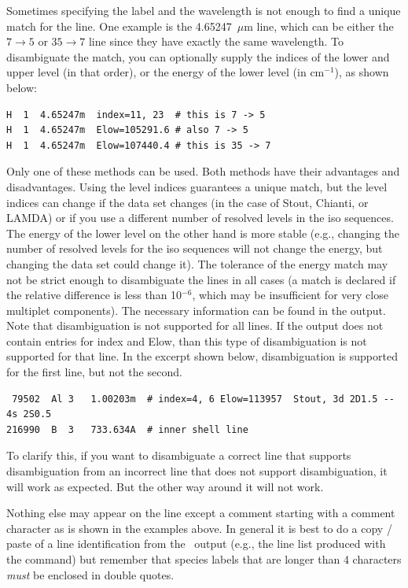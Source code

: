 Sometimes specifying the label and the wavelength is not enough to find a
unique match for the line. One example is the  4.65247~$\mu$m line,
which can be either the $7 \rightarrow 5$ or $35 \rightarrow 7$ line since
they have exactly the same wavelength. To disambiguate the match, you can
optionally supply the indices of the lower and upper level (in that order), or
the energy of the lower level (in cm$^{-1}$), as shown below:
\begin{verbatim}
H  1  4.65247m  index=11, 23  # this is 7 -> 5
H  1  4.65247m  Elow=105291.6 # also 7 -> 5
H  1  4.65247m  Elow=107440.4 # this is 35 -> 7
\end{verbatim}
Only one of these methods can be used. Both methods have their advantages and
disadvantages. Using the level indices guarantees a unique match, but the
level indices can change if the data set changes (in the case of Stout,
Chianti, or LAMDA) or if you use a different number of resolved levels in the
iso sequences. The energy of the lower level on the other hand is more stable
(e.g., changing the number of resolved levels for the iso sequences will not
change the energy, but changing the data set could change it). The tolerance
of the energy match may not be strict enough to disambiguate the lines in all
cases (a match is declared if the relative difference is less than 10$^{-6}$,
which may be insufficient for very close multiplet components). The necessary
information can be found in the  output. Note that
disambiguation is not supported for all lines. If the  output does not contain entries for index and Elow, than this type
of disambiguation is not supported for that line. In the excerpt shown below,
disambiguation is supported for the first line, but not the second.
\begin{verbatim}
 79502  Al 3   1.00203m  # index=4, 6 Elow=113957  Stout, 3d 2D1.5 -- 4s 2S0.5
216990  B  3   733.634A  # inner shell line
\end{verbatim}
To clarify this, if you want to disambiguate a correct line that supports
disambiguation from an incorrect line that does not support disambiguation, it
will work as expected. But the other way around it will not work.

Nothing else may appear on the line except a comment starting with a comment
character as is shown in the examples above. In general it is best to do a
copy / paste of a line identification from the \Cloudy\ output (e.g., the line
list produced with the  command) but remember that
species labels that are longer than 4 characters {\em must} be enclosed in
double quotes.


